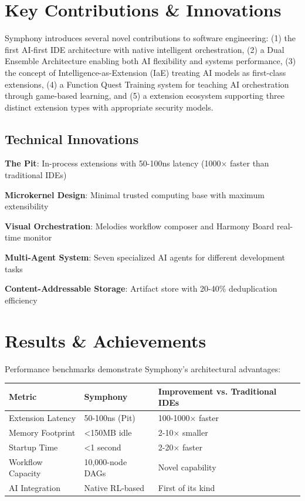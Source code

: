\section*{Key Contributions \& Innovations}

\begin{successbox}
Symphony introduces several novel contributions to software engineering: (1) the first AI-first IDE architecture with native intelligent orchestration, (2) a Dual Ensemble Architecture enabling both AI flexibility and systems performance, (3) the concept of Intelligence-as-Extension (IaE) treating AI models as first-class extensions, (4) a Function Quest Training system for teaching AI orchestration through game-based learning, and (5) a extension ecosystem supporting three distinct extension types with appropriate security models.
\end{successbox}

\subsection*{Technical Innovations}
\begin{compactlist}
    \item \textbf{The Pit}: In-process extensions with 50-100ns latency (1000× faster than traditional IDEs)
    \item \textbf{Microkernel Design}: Minimal trusted computing base with maximum extensibility
    \item \textbf{Visual Orchestration}: Melodies workflow composer and Harmony Board real-time monitor
    \item \textbf{Multi-Agent System}: Seven specialized AI agents for different development tasks
    \item \textbf{Content-Addressable Storage}: Artifact store with 20-40\% deduplication efficiency
\end{compactlist}

\section*{Results \& Achievements}

Performance benchmarks demonstrate Symphony's architectural advantages:

\begin{table}[ht]
\centering
\begin{tabular}{@{}lll@{}}
\toprule
\textbf{Metric} & \textbf{Symphony} & \textbf{Improvement vs. Traditional IDEs} \\
\midrule
Extension Latency & 50-100ns (Pit) & 100-1000× faster \\
Memory Footprint & <150MB idle & 2-10× smaller \\
Startup Time & <1 second & 2-20× faster \\
Workflow Capacity & 10,000-node DAGs & Novel capability \\
AI Integration & Native RL-based & First of its kind \\
\bottomrule
\end{tabular}
\end{table}

